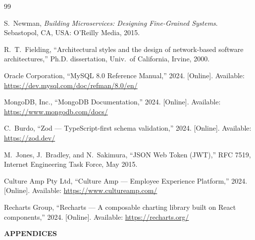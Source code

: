 \documentclass[12pt,a4paper]{article}
\begin{document}
\begin{thebibliography}{99}

S.~Newman, \textit{Building Microservices: Designing Fine-Grained
Systems}. Sebastopol, CA, USA: O'Reilly Media, 2015.

R.~T.~Fielding, ``Architectural styles and the design of network-based
software architectures,'' Ph.D. dissertation, Univ.\ of California,
Irvine, 2000.


Oracle Corporation, ``MySQL 8.0 Reference Manual,'' 2024. [Online].
Available: \url{https://dev.mysql.com/doc/refman/8.0/en/}

MongoDB, Inc., ``MongoDB Documentation,'' 2024. [Online]. Available:
\url{https://www.mongodb.com/docs/}


C.~Burdo, ``Zod --- TypeScript-first schema validation,'' 2024. [Online].
Available: \url{https://zod.dev/}

M.~Jones, J.~Bradley, and N.~Sakimura, ``JSON Web Token (JWT),'' RFC
7519, Internet Engineering Task Force, May 2015.


Culture Amp Pty Ltd, ``Culture Amp --- Employee Experience Platform,''
2024. [Online]. Available: \url{https://www.cultureamp.com/}


Recharts Group, ``Recharts --- A composable charting library built on
React components,'' 2024. [Online]. Available:
\url{https://recharts.org/}

\end{thebibliography}


\newpage
{}

\begin{center}
  \textbf{APPENDICES}
\end{center}
\end{document}
